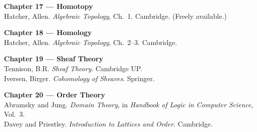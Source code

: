 \documentclass[12pt, twoside, openright, a4paper]{book}
\begin{document}
\medskip\noindent\textbf{Chapter 17 --- Homotopy}\\
Hatcher, Allen. \textit{Algebraic Topology}, Ch.\ 1. Cambridge. (Freely available.)

\medskip\noindent\textbf{Chapter 18 --- Homology}\\
Hatcher, Allen. \textit{Algebraic Topology}, Ch.\ 2--3. Cambridge.

\medskip\noindent\textbf{Chapter 19 --- Sheaf Theory}\\
Tennison, B.R. \textit{Sheaf Theory}. Cambridge UP.\\
Iversen, Birger. \textit{Cohomology of Sheaves}. Springer.

\medskip\noindent\textbf{Chapter 20 --- Order Theory}\\
Abramsky and Jung. \textit{Domain Theory}, in \textit{Handbook of Logic in Computer Science}, Vol.\ 3.\\
Davey and Priestley. \textit{Introduction to Lattices and Order}. Cambridge.
\end{document}

